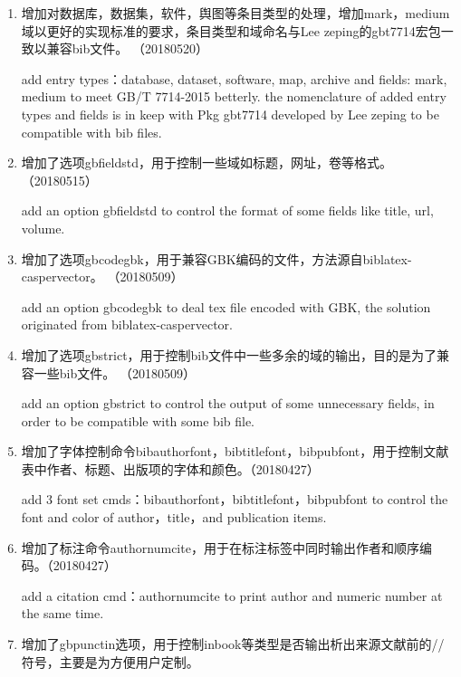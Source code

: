 
\label{up:180403}
\begin{enumerate}
\item 增加对数据库，数据集，软件，舆图等条目类型的处理，增加mark，medium域以更好的实现标准的要求，条目类型和域命名与Lee zeping的gbt7714宏包一致以兼容bib文件。 （20180520）
    
add entry types：database, dataset, software, map, archive and fields: mark, medium to meet GB/T 7714-2015 betterly. the nomenclature of added entry types and fields is in keep with Pkg gbt7714 developed by Lee zeping to be compatible with bib files.

\item 增加了选项gbfieldstd，用于控制一些域如标题，网址，卷等格式。 （20180515）

add an option gbfieldstd to control the format of some fields like title, url, volume.

\item 增加了选项gbcodegbk，用于兼容GBK编码的文件，方法源自biblatex-caspervector。 （20180509）

add an option gbcodegbk to deal tex file encoded with GBK, the solution originated from biblatex-caspervector.

\item 增加了选项gbstrict，用于控制bib文件中一些多余的域的输出，目的是为了兼容一些bib文件。 （20180509）

add an option gbstrict to control the output of some unnecessary fields, in order to be compatible with some bib file.

\item 增加了字体控制命令bibauthorfont，bibtitlefont，bibpubfont，用于控制文献表中作者、标题、出版项的字体和颜色。（20180427）

add 3 font set cmds：bibauthorfont，bibtitlefont，bibpubfont to control the font and color of author，title，and publication items.

\item 增加了标注命令authornumcite，用于在标注标签中同时输出作者和顺序编码。（20180427）

add a citation cmd：authornumcite to print author and numeric number at the same time.

\item 增加了gbpunctin选项，用于控制inbook等类型是否输出析出来源文献前的//符号，主要是为方便用户定制。


\end{enumerate}
